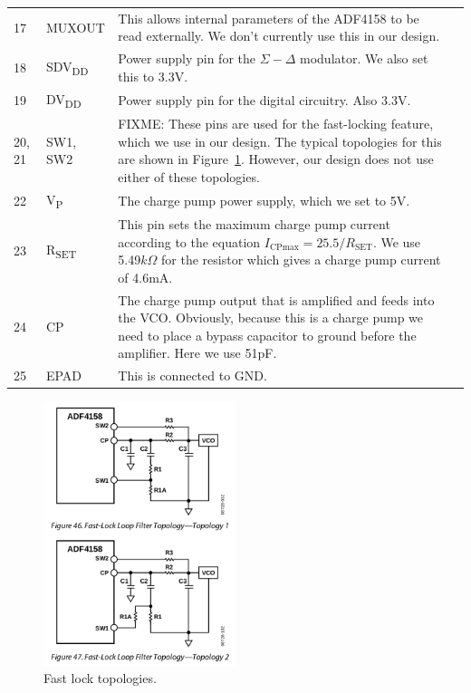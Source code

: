 \begin{tabularx}{\textwidth}{l l X>{\raggedright\arraybackslash}X}
        17 & MUXOUT & This allows internal parameters of the ADF4158 to be read externally. We don't
        currently use this in our design. \\
        18 & SDV\textsubscript{DD} & Power supply pin for the $\Sigma-\Delta$ modulator. We also set this
        to 3.3V. \\
        19 & DV\textsubscript{DD} & Power supply pin for the digital circuitry. Also 3.3V. \\
        20, 21 & SW1, SW2 & FIXME: These pins are used for the fast-locking feature, which we use in our
        design. The typical topologies for this are shown in
        Figure~\ref{fig:adf4158-fast-lock}. However, our design does not use either of
        these topologies. \\
        22 & V\textsubscript{P} & The charge pump power supply, which we set to 5V. \\
        23 & R\textsubscript{SET} & This pin sets the maximum charge pump current according to the
        equation $I_{\text{CPmax}}=25.5/R_{\text{SET}}$. We use
        5.49$\si{k\Omega}$ for the resistor which gives a charge pump current
        of 4.6mA. \\
        24 & CP & The charge pump output that is amplified and feeds into the VCO. Obviously, because this
        is a charge pump we need to place a bypass capacitor to ground before the
        amplifier. Here we use 51pF. \\
        25 & EPAD & This is connected to GND. \\

        \bottomrule
\end{tabularx}

\begin{figure}[h]
        \centering
        \includegraphics[width=0.5\textwidth]{data/adf4158-fast-lock.png}
        \caption{Fast lock topologies.}
        \label{fig:adf4158-fast-lock}
\end{figure}

